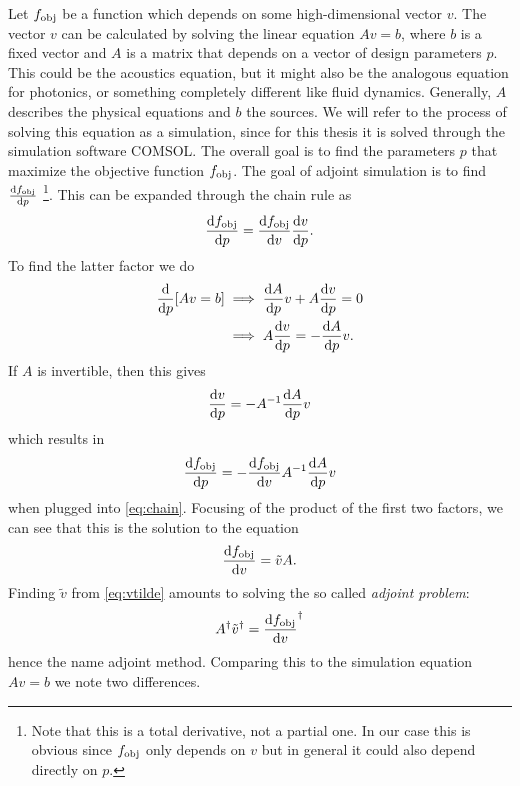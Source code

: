 Let $f_\text{obj}$ be a function which depends on some high-dimensional vector $v$.
The vector $v$ can be calculated by solving the linear equation
$A v = b$, where $b$ is a fixed vector and $A$ is a matrix that depends on a
vector of design parameters $p$.
This could be the acoustics equation, but it might also be the analogous
equation for photonics, or something completely different like fluid dynamics.
Generally, $A$ describes the physical equations and $b$ the sources.
We will refer to the process of solving this equation as a simulation, since for
this thesis it is solved through the simulation software COMSOL.
The overall goal is to find the parameters $p$ that maximize the objective
function $f_\text{obj}$.
The goal of adjoint simulation is to find $\diff{\fobj}{p}$%
\footnote{%
	Note that this is a total derivative, not a partial one. In our case this is
	obvious since $f_\text{obj}$ only depends on $v$ but in general it could also
	depend directly on $p$.
}.
This can be expanded through the chain rule as
\begin{equation}\label{eq:chain}
	\diff{\fobj}{p} = \diff{\fobj}{v} \diff{v}{p}.
\end{equation}
To find the latter factor we do
\begin{align}
	\diff{}{p} [Av = b] &\implies \diff{A}{p} v + A \diff{v}{p} = 0\\
						&\implies A\diff{v}{p} = -\diff{A}{p}
						v.\label{eq:direct_dvdp_solve}
\end{align}
If $A$ is invertible, then this gives
\begin{equation}
	\label{eq:direct_dvdp_solve2}
	\diff{v}{p} = -A^{-1}\diff{A}{p} v
\end{equation}
which results in
\begin{equation}
	\diff{\fobj}{p} = -\diff{\fobj}{v} A^{-1} \diff{A}{p} v
\end{equation}
when plugged into \cref{eq:chain}.
Focusing of the product of the first two factors, we can see that this is the
solution to the equation
\begin{equation}\label{eq:vtilde}
	\diff{\fobj}{v} = \tilde v A.
\end{equation}
Finding $\tilde v$ from \cref{eq:vtilde} amounts to solving the so called
\emph{adjoint problem}:
\begin{equation}\label{eq:gen_adjoint_problem}
	A^\dagger \tilde v^\dagger = \diff{\fobj}{v}^\dagger
\end{equation}
hence the name adjoint method.
Comparing this to the simulation equation $Av = b$ we note two differences.
